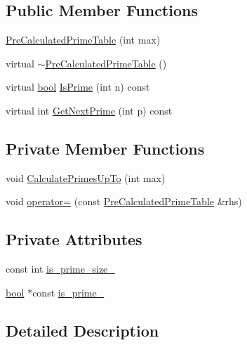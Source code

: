 \subsection*{Public Member Functions}
\begin{DoxyCompactItemize}
\item 
\hyperlink{classPreCalculatedPrimeTable_a6bb947504421e31da70d2c71576be350}{Pre\+Calculated\+Prime\+Table} (int max)
\item 
virtual \hyperlink{classPreCalculatedPrimeTable_a6ceab295f80dbe2766b8d4f54138bbc4}{$\sim$\+Pre\+Calculated\+Prime\+Table} ()
\item 
virtual \hyperlink{classbool}{bool} \hyperlink{classPreCalculatedPrimeTable_a8a9ab7f99b09e5e987933c260e7304cf}{Is\+Prime} (int n) const
\item 
virtual int \hyperlink{classPreCalculatedPrimeTable_a0ff10b1fe13df7e56b8d7ed9f41d3998}{Get\+Next\+Prime} (int p) const
\end{DoxyCompactItemize}
\subsection*{Private Member Functions}
\begin{DoxyCompactItemize}
\item 
void \hyperlink{classPreCalculatedPrimeTable_a393cb4947a57da9442e435eeff168b76}{Calculate\+Primes\+Up\+To} (int max)
\item 
void \hyperlink{classPreCalculatedPrimeTable_a67012c43b78cee27b891a9934becc455}{operator=} (const \hyperlink{classPreCalculatedPrimeTable}{Pre\+Calculated\+Prime\+Table} \&rhs)
\end{DoxyCompactItemize}
\subsection*{Private Attributes}
\begin{DoxyCompactItemize}
\item 
const int \hyperlink{classPreCalculatedPrimeTable_ad4275df41c5e5be3cad8c5abeaad1ac6}{is\+\_\+prime\+\_\+size\+\_\+}
\item 
\hyperlink{classbool}{bool} $\ast$const \hyperlink{classPreCalculatedPrimeTable_ac393ebf41a32b3cba39fe67f7aa5fa38}{is\+\_\+prime\+\_\+}
\end{DoxyCompactItemize}


\subsection{Detailed Description}


